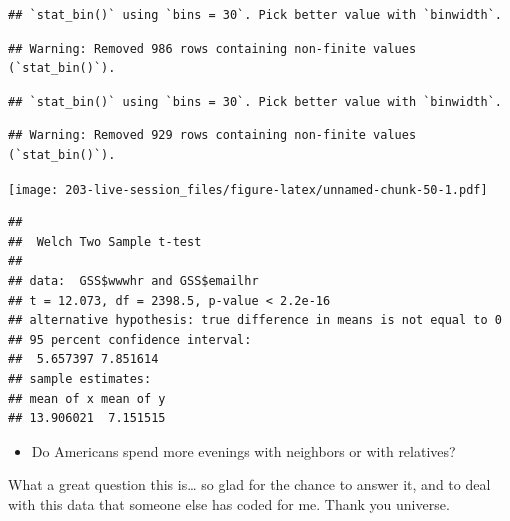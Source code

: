 \documentclass[
]{book}
\newenvironment{Shaded}{\begin{snugshade}}{\end{snugshade}}
\newcommand{\AttributeTok}[1]{\textcolor[rgb]{0.77,0.63,0.00}{#1}}
\newcommand{\ConstantTok}[1]{\textcolor[rgb]{0.00,0.00,0.00}{#1}}
\newcommand{\FunctionTok}[1]{\textcolor[rgb]{0.00,0.00,0.00}{#1}}
\newcommand{\NormalTok}[1]{#1}
\newcommand{\SpecialCharTok}[1]{\textcolor[rgb]{0.00,0.00,0.00}{#1}}
\providecommand{\tightlist}{%
  \setlength{\itemsep}{0pt}\setlength{\parskip}{0pt}}
\theoremstyle{definition}
\theoremstyle{definition}
\theoremstyle{definition}
\theoremstyle{definition}
\theoremstyle{remark}
\begin{document}
\begin{verbatim}
## `stat_bin()` using `bins = 30`. Pick better value with `binwidth`.
\end{verbatim}

\begin{verbatim}
## Warning: Removed 986 rows containing non-finite values (`stat_bin()`).
\end{verbatim}

\begin{verbatim}
## `stat_bin()` using `bins = 30`. Pick better value with `binwidth`.
\end{verbatim}

\begin{verbatim}
## Warning: Removed 929 rows containing non-finite values (`stat_bin()`).
\end{verbatim}

\texttt{[image: 203-live-session\_files/figure-latex/unnamed-chunk-50-1.pdf]}

\begin{Shaded}
\end{Shaded}

\begin{verbatim}
## 
##  Welch Two Sample t-test
## 
## data:  GSS$wwwhr and GSS$emailhr
## t = 12.073, df = 2398.5, p-value < 2.2e-16
## alternative hypothesis: true difference in means is not equal to 0
## 95 percent confidence interval:
##  5.657397 7.851614
## sample estimates:
## mean of x mean of y 
## 13.906021  7.151515
\end{verbatim}

\begin{itemize}
\tightlist
\item
  Do Americans spend more evenings with neighbors or with relatives?
\end{itemize}

What a great question this is\ldots{} so glad for the chance to answer it, and to deal with this data that someone else has coded for me. Thank you universe.
\end{document}
